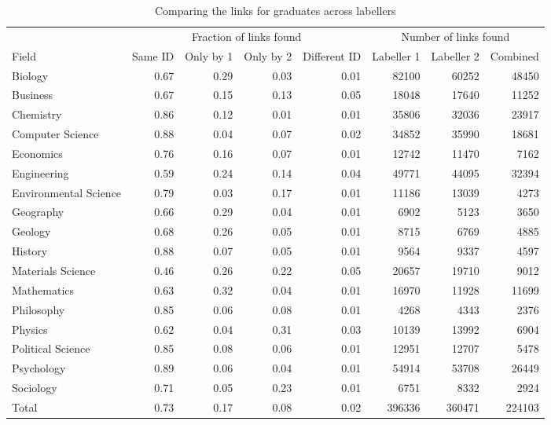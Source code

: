 \begin{table}

\caption{\label{tab:compare_linking_graduates}Comparing the links for graduates across labellers}
\centering
\fontsize{9}{11}\selectfont
\begin{threeparttable}
\begin{tabular}[t]{lrrrrrrr}
\toprule
\multicolumn{1}{c}{ } & \multicolumn{4}{c}{Fraction of links found} & \multicolumn{3}{c}{Number of links found} \\
\cmidrule(l{3pt}r{3pt}){2-5} \cmidrule(l{3pt}r{3pt}){6-8}
Field & Same ID & Only by 1 & Only by 2 & Different ID & Labeller 1 & Labeller 2 & Combined\\
\midrule
Biology & 0.67 & 0.29 & 0.03 & 0.01 & 82100 & 60252 & 48450\\
Business & 0.67 & 0.15 & 0.13 & 0.05 & 18048 & 17640 & 11252\\
Chemistry & 0.86 & 0.12 & 0.01 & 0.01 & 35806 & 32036 & 23917\\
Computer Science & 0.88 & 0.04 & 0.07 & 0.02 & 34852 & 35990 & 18681\\
Economics & 0.76 & 0.16 & 0.07 & 0.01 & 12742 & 11470 & 7162\\
\addlinespace
Engineering & 0.59 & 0.24 & 0.14 & 0.04 & 49771 & 44095 & 32394\\
Environmental Science & 0.79 & 0.03 & 0.17 & 0.01 & 11186 & 13039 & 4273\\
Geography & 0.66 & 0.29 & 0.04 & 0.01 & 6902 & 5123 & 3650\\
Geology & 0.68 & 0.26 & 0.05 & 0.01 & 8715 & 6769 & 4885\\
History & 0.88 & 0.07 & 0.05 & 0.01 & 9564 & 9337 & 4597\\
\addlinespace
Materials Science & 0.46 & 0.26 & 0.22 & 0.05 & 20657 & 19710 & 9012\\
Mathematics & 0.63 & 0.32 & 0.04 & 0.01 & 16970 & 11928 & 11699\\
Philosophy & 0.85 & 0.06 & 0.08 & 0.01 & 4268 & 4343 & 2376\\
Physics & 0.62 & 0.04 & 0.31 & 0.03 & 10139 & 13992 & 6904\\
Political Science & 0.85 & 0.08 & 0.06 & 0.01 & 12951 & 12707 & 5478\\
\addlinespace
Psychology & 0.89 & 0.06 & 0.04 & 0.01 & 54914 & 53708 & 26449\\
Sociology & 0.71 & 0.05 & 0.23 & 0.01 & 6751 & 8332 & 2924\\
\midrule
Total & 0.73 & 0.17 & 0.08 & 0.02 & 396336 & 360471 & 224103\\

\end{tabular}
\end{threeparttable}
\end{table}
